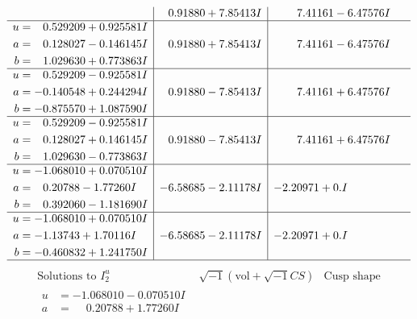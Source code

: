 \documentclass[1p]{elsarticle_modified}
\theoremstyle{definition}
\newcommand{\I}{\sqrt{-1}}
\begin{document}
$$\begin{array}{c|c|c}
 & \phantom{-}0.91880 + 7.85413 I & \phantom{-}7.41161 - 6.47576 I \\ \hline\begin{aligned}
u &= \phantom{-}0.529209 + 0.925581 I \\
a &= \phantom{-}0.128027 - 0.146145 I \\
b &= \phantom{-}1.029630 + 0.773863 I\end{aligned}
 & \phantom{-}0.91880 + 7.85413 I & \phantom{-}7.41161 - 6.47576 I \\ \hline\begin{aligned}
u &= \phantom{-}0.529209 - 0.925581 I \\
a &= -0.140548 + 0.244294 I \\
b &= -0.875570 + 1.087590 I\end{aligned}
 & \phantom{-}0.91880 - 7.85413 I & \phantom{-}7.41161 + 6.47576 I \\ \hline\begin{aligned}
u &= \phantom{-}0.529209 - 0.925581 I \\
a &= \phantom{-}0.128027 + 0.146145 I \\
b &= \phantom{-}1.029630 - 0.773863 I\end{aligned}
 & \phantom{-}0.91880 - 7.85413 I & \phantom{-}7.41161 + 6.47576 I \\ \hline\begin{aligned}
u &= -1.068010 + 0.070510 I \\
a &= \phantom{-}0.20788 - 1.77260 I \\
b &= \phantom{-}0.392060 - 1.181690 I\end{aligned}
 & -6.58685 - 2.11178 I & -2.20971 + 0. I\phantom{ +0.000000I} \\ \hline\begin{aligned}
u &= -1.068010 + 0.070510 I \\
a &= -1.13743 + 1.70116 I \\
b &= -0.460832 + 1.241750 I\end{aligned}
 & -6.58685 - 2.11178 I & -2.20971 + 0. I\phantom{ +0.000000I}\\
 \hline 
 \end{array}$$\newpage$$\begin{array}{c|c|c}  
\text{Solutions to }I^u_{2}& \I (\text{vol} + \sqrt{-1}CS) & \text{Cusp shape}\\
 \hline 
\begin{aligned}
u &= -1.068010 - 0.070510 I \\
a &= \phantom{-}0.20788 + 1.77260 I \\

\end{aligned}
\end{array}$$
\end{document}
